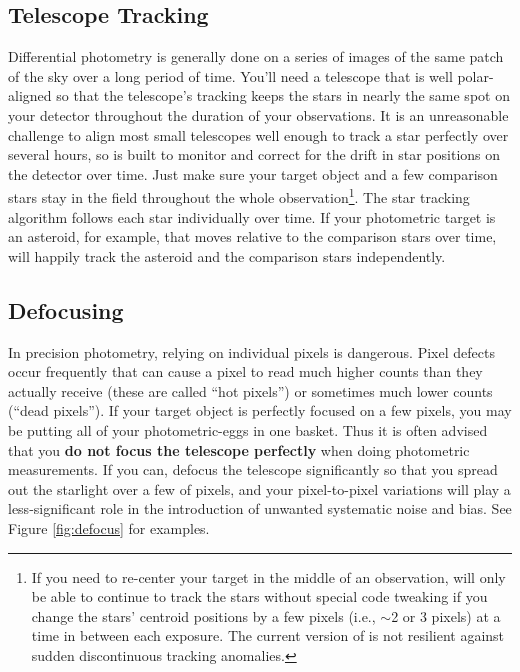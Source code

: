 \documentclass[a4paper]{article}
\begin{document}
\subsection{Telescope Tracking}

Differential photometry is generally done on a series of images of the same patch of the sky over a long period of time. You'll need a telescope that is well polar-aligned so that the telescope's tracking keeps the stars in nearly the same spot on your detector throughout the duration of your observations. It is an unreasonable challenge to align most small telescopes well enough to track a star perfectly over several hours, so \oscaar is built to monitor and correct for the drift in star positions on the detector over time. Just make sure your target object and a few comparison stars stay in the field throughout the whole observation\footnote{If you need to re-center your target in the middle of an observation, \oscaar will only be able to continue to track the stars without special code tweaking if you change the stars' centroid positions by a few pixels (i.e., $\sim$2 or 3 pixels) at a time in between each exposure. The current version of \oscaar is not resilient against sudden discontinuous tracking anomalies.}. The star tracking algorithm follows each star individually over time. If your photometric target is an asteroid, for example, that moves relative to the comparison stars over time, \oscaar will happily track the asteroid and the comparison stars independently. 

\subsection{Defocusing} \label{sec:defocusing}

In precision photometry, relying on individual pixels is dangerous. Pixel defects occur frequently that can cause a pixel to read much higher counts than they actually receive (these are called ``hot pixels'') or sometimes much lower counts (``dead pixels''). If your target object is perfectly focused on a few pixels, you may be putting all of your photometric-eggs in one basket. Thus it is often advised that you \textbf{do not focus the telescope perfectly} when doing photometric measurements. If you can, defocus the telescope significantly so that you spread out the starlight over a few of pixels, and your pixel-to-pixel variations will play a less-significant role in the introduction of unwanted systematic noise and bias. See Figure \ref{fig:defocus} for examples.
\end{document}
